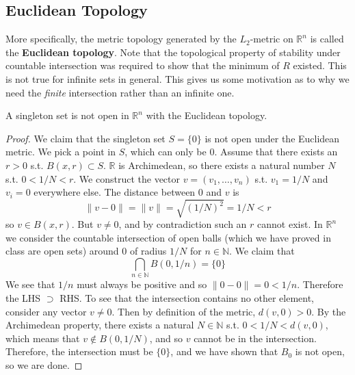 \subsection{Euclidean Topology}

  More specifically, the metric topology generated by the $L_2$-metric on $\mathbb{R}^n$ is called the \textbf{Euclidean topology}. Note that the topological property of stability under countable intersection was required to show that the minimum of $R$ existed. This is not true for infinite sets in general. This gives us some motivation as to why we need the \textit{finite} intersection rather than an infinite one. 
  
  \begin{lemma}
    A singleton set is not open in $\mathbb{R}^n$ with the Euclidean topology.   
  \end{lemma}
  \begin{proof}
    We claim that the singleton set $S = \{0\}$ is not open under the Euclidean metric. We pick a point in $S$, which can only be $0$. Assume that there exists an $r > 0$ s.t. $B(x, r) \subset S$. $\mathbb{R}$ is Archimedean, so there exists a natural number $N$ s.t. $0 < 1/N < r$. We construct the vector $v = (v_1, \ldots, v_n)$ s.t. $v_1 = 1/N$ and $v_i = 0$ everywhere else. The distance between $0$ and $v$ is 
    \begin{equation}
      \| v - 0 \| = \|v\| = \sqrt{(1/N)^2} = 1/N < r
    \end{equation} 
    so $v \in B(x, r)$. But $v \neq 0$, and by contradiction such an $r$ cannot exist. In $\mathbb{R}^n$ we consider the countable intersection of open balls (which we have proved in class are open sets) around $0$ of radius $1/N$ for $n \in \mathbb{N}$. We claim that 
    \begin{equation}
      \bigcap_{n \in \mathbb{N}} B(0, 1/n) = \{0\}
    \end{equation} 
    We see that $1/n$ must always be positive and so $\|0 - 0\| = 0 < 1/n$. Therefore the LHS $\supset $ RHS. To see that the intersection contains no other element, consider any vector $v \neq 0$. Then by definition of the metric, $d(v, 0) > 0$. By the Archimedean property, there exists a natural $N \in \mathbb{N}$ s.t. $0 < 1/N < d(v, 0)$, which means that $v \not\in B(0, 1/N)$, and so $v$ cannot be in the intersection. Therefore, the intersection must be $\{0\}$, and we have shown that $B_0$ is not open, so we are done. 
  \end{proof}

